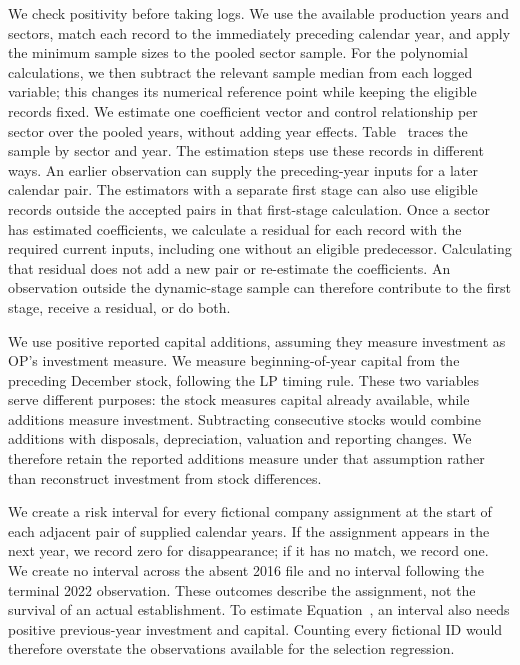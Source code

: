 We check positivity before taking logs. We use the available production years and sectors, match each record to the immediately preceding calendar year, and apply the minimum sample sizes to the pooled sector sample. For the polynomial calculations, we then subtract the relevant sample median from each logged variable; this changes its numerical reference point while keeping the eligible records fixed. We estimate one coefficient vector and control relationship per sector over the pooled years, without adding year effects. Table~ traces the sample by sector and year.
The estimation steps use these records in different ways. An earlier observation can supply the preceding-year inputs for a later calendar pair. The estimators with a separate first stage can also use eligible records outside the accepted pairs in that first-stage calculation. Once a sector has estimated coefficients, we calculate a residual for each record with the required current inputs, including one without an eligible predecessor. Calculating that residual does not add a new pair or re-estimate the coefficients. An observation outside the dynamic-stage sample can therefore contribute to the first stage, receive a residual, or do both.


We use positive reported capital additions, assuming they measure investment as OP's investment measure. We measure beginning-of-year capital from the preceding December stock, following the LP timing rule. These two variables serve different purposes: the stock measures capital already available, while additions measure investment. Subtracting consecutive stocks would combine additions with disposals, depreciation, valuation and reporting changes. We therefore retain the reported additions measure under that assumption rather than reconstruct investment from stock differences.

We create a risk interval for every fictional company assignment at the start of each adjacent pair of supplied calendar years. If the assignment appears in the next year, we record zero for disappearance; if it has no match, we record one. We create no interval across the absent 2016 file and no interval following the terminal 2022 observation. These outcomes describe the assignment, not the survival of an actual establishment. To estimate Equation~, an interval also needs positive previous-year investment and capital. Counting every fictional ID would therefore overstate the observations available for the selection regression.

